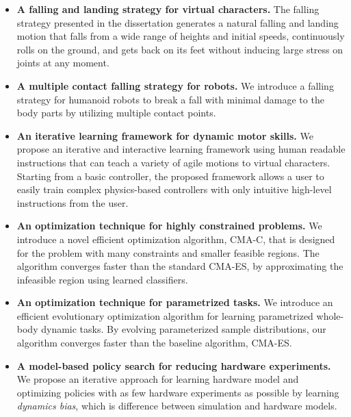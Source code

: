 \begin{itemize}
\item \textbf{A falling and landing strategy for virtual characters.}
  The falling strategy presented in the dissertation generates a natural falling
  and landing motion that falls from a wide range of heights and initial
  speeds, continuously rolls on the ground, and gets back on its feet without
  inducing large stress on joints at any moment.
\item \textbf{A multiple contact falling strategy for robots.}
  We introduce a falling strategy for humanoid robots
  to break a fall with minimal damage to the body parts
  by utilizing multiple contact points.
\item \textbf{An iterative learning framework for dynamic motor skills.}
  We propose an iterative and interactive learning framework 
  using human readable instructions that can teach a variety of agile motions
  to virtual characters.
  Starting from a basic controller, the proposed framework allows a user 
  to easily train complex physics-based controllers 
  with only intuitive high-level instructions from the user.
\item \textbf{An optimization technique for highly constrained problems.}
  We introduce a novel efficient optimization algorithm, CMA-C, that is 
  designed for the problem with many constraints and smaller feasible regions.
  The algorithm converges faster than the standard CMA-ES,
  by approximating the infeasible region using learned classifiers.
\item \textbf{An optimization technique for parametrized tasks.}
  We introduce an efficient evolutionary optimization algorithm for learning
  parametrized whole-body dynamic tasks.
  By evolving parameterized sample distributions, our algorithm
  converges faster than the baseline algorithm, CMA-ES.
\item \textbf{A model-based policy search for reducing hardware experiments.}
  We propose an iterative approach for learning hardware model and optimizing
  policies with as few hardware experiments as possible by learning
  \emph{dynamics bias}, which is difference between simulation and hardware
  models. 
\end{itemize}



